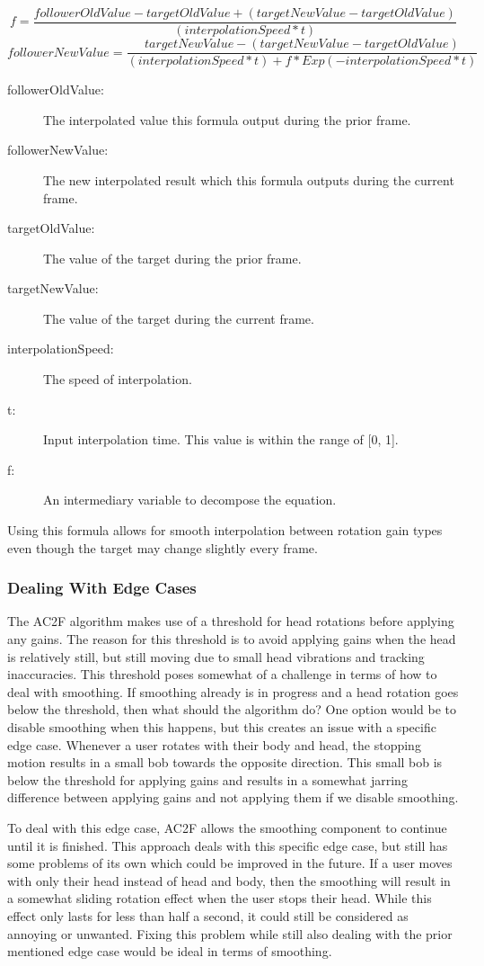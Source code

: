 $$
f = \frac{followerOldValue - targetOldValue + (targetNewValue - targetOldValue)}{(interpolationSpeed * t)}
$$
$$
followerNewValue = \frac{targetNewValue - (targetNewValue - targetOldValue)}{(interpolationSpeed * t) + f * Exp(-interpolationSpeed * t)}
$$
\begin{description}
    \item[followerOldValue:] The interpolated value this formula output during the prior frame.
    \item[followerNewValue:] The new interpolated result which this formula outputs during the current frame.
    \item[targetOldValue:] The value of the target during the prior frame. 
    \item[targetNewValue:] The value of the target during the current frame.
    \item[interpolationSpeed:] The speed of interpolation.
    \item[t:] Input interpolation time. This value is within the range of [0, 1]. 
    \item[f:] An intermediary variable to decompose the equation.
\end{description}

Using this formula allows for smooth interpolation between rotation gain types even though the target may change slightly every frame. 

\subsubsection{Dealing With Edge Cases}
The AC2F algorithm makes use of a threshold for head rotations before applying any gains. The reason for this threshold is to avoid applying gains when the head is relatively still, but still moving due to small head vibrations and tracking inaccuracies. This threshold poses somewhat of a challenge in terms of how to deal with smoothing. If smoothing already is in progress and a head rotation goes below the threshold, then what should the algorithm do? One option would be to disable smoothing when this happens, but this creates an issue with a specific edge case. Whenever a user rotates with their body and head, the stopping motion results in a small bob towards the opposite direction. This small bob is below the threshold for applying gains and results in a somewhat jarring difference between applying gains and not applying them if we disable smoothing.

To deal with this edge case, AC2F allows the smoothing component to continue until it is finished. This approach deals with this specific edge case, but still has some problems of its own which could be improved in the future. If a user moves with only their head instead of head and body, then the smoothing will result in a somewhat sliding rotation effect when the user stops their head. While this effect only lasts for less than half a second, it could still be considered as annoying or unwanted. Fixing this problem while still also dealing with the prior mentioned edge case would be ideal in terms of smoothing. 

